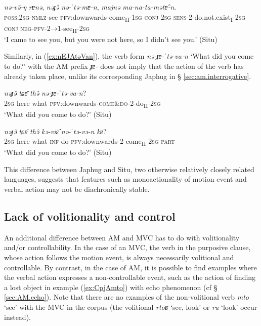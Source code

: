 \documentclass[oneside,a4paper,11pt]{article}
\newcommand{\ipa}[1]{{\phon\textit{#1}}}
\newcommand{\japhug}[2]{\textit{\phon#1} `#2'}
\newcommand{\sens}[1]{‘#1’}
\newcommand{\rouge}[1]{{\color{red}#1}}
\begin{document}
\begin{exe}
\ex  \label{ex:nEkEnatso}
\gll \ipa{nə-kə-natsō} \ipa{nə-və̄-ŋ} \ipa{rɐnə}, \ipa{nəɟə̂} \ipa{nə-ˈtə-mɐ-n}, \ipa{majnə} \ipa{ma-na-ta-mətɐ̂-n}.\\
\textsc{poss.2sg}-\textsc{nmlz}-see \textsc{pfv}:downwards-come\textsubscript{II}-\textsc{1sg} \textsc{conj} \textsc{2sg} \textsc{sens}-2-do.not.exist\textsubscript{I}-\textsc{2sg} \textsc{conj} \textsc{neg}-\textsc{pfv}-2→1-see\textsubscript{II}-\textsc{2sg}\\
\glt  \sens{I came to see you, but you were not here, so I didn't see you.} (Situ)
\end{exe}

Similarly, in (\ref{ex:nEJAtəVan}), the verb form  \ipa{nə-ɟɐ-ˈtə-va-n}  \sens{What did you come to do?} with the AM prefix \ipa{ɟɐ-} does not imply that the action of the verb has already taken place, unlike its corresponding Japhug in § \ref{sec:am.interrogative}.

 

\begin{exe}
\ex \label{ex:nEJAtəVan}
\gll
\ipa{nəɟə̂} \ipa{tɕɐ̄} \ipa{thə̂} \ipa{nə-\rouge{ɟɐ}-ˈtə-va-n}? \\
\textsc{2sg} here what  \textsc{pfv}:downwards-\textsc{\rouge{come\&do}}-2-do\textsubscript{II}-\textsc{2sg} \\
\glt  \sens{What did you come to do?} (Situ)
\end{exe}

\begin{exe}
\ex \label{ex:nEtEvEn}
\gll
\ipa{nəɟə̂} \ipa{tɕɐ̄} \ipa{thə̂} \ipa{kə-viɛ̂} \ipa{nə-ˈtə-və-n} \ipa{kɐ}? \\
\textsc{2sg} here what \textsc{inf}-do \textsc{pfv}:downwards-2-come\textsubscript{II}-\textsc{2sg} \textsc{part} \\
\glt  \sens{What did you come to do?} (Situ)
\end{exe}

This difference between Japhug and Situ, two otherwise relatively closely related languages, suggests that features such as monoactionality of motion event and verbal action may not be diachronically stable.

\subsection{Lack of volitionality and control } \label{sec:volitionality}
An additional difference between AM and MVC has to do with volitionality and/or controllability. In the case of an MVC, the verb in the purposive clause, whose action follows the motion event, is always necessarily volitional and controllable. By contrast, in the case of AM, it is possible to find examples where the verbal action expresses a non-controllable event, such as the action of finding a lost object in example (\ref{ex:CpjAmto}) with echo phenomenon (cf § \ref{sec:AM.echo}). Note that there are no examples of the non-volitional verb \japhug{mto}{see} with the MVC in the corpus (the volitional \japhug{rtoʁ}{see, look} or \japhug{ru}{look} occur  instead). 
\end{document}
